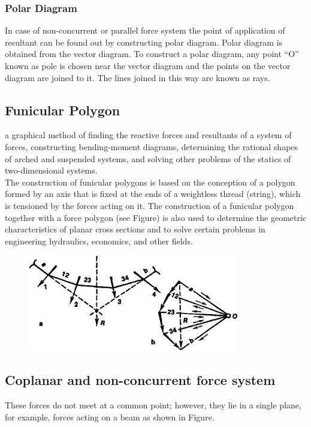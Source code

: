 \documentclass[11pt]{article}
\begin{document}
\subsubsection{Polar Diagram}
In case of non-concurrent or parallel force system the point of
application of resultant can be found out by constructing polar diagram. Polar
diagram is obtained from the vector diagram. To construct a polar diagram, any
point “O” known as pole is chosen near the vector diagram and the points on the
vector diagram are joined to it. The lines joined in this way are known as rays. 
\subsection{Funicular Polygon}

a graphical method of finding the reactive forces and resultants of a system of forces, constructing bending-moment diagrams, determining the rational shapes of arched and suspended systems, and solving other problems of the statics of two-dimensional systems.\\

The construction of funicular polygons is based on the conception of a polygon formed by an axis that is fixed at the ends of a weightless thread (string), which is tensioned by the forces acting on it. The construction of a funicular polygon together with a force polygon (see Figure) is also used to determine the geometric characteristics of planar cross sections and to solve certain problems in engineering hydraulics, economics, and other fields.
\begin{figure}[H]
	\centering
	\includegraphics[scale=0.5]{fp.jpg}
	\label{fig: Polygon Law}

\end{figure}

\subsection{Coplanar and non-concurrent force system}
These forces do not meet at a common point; however, they lie in a single plane, for example, forces acting on a beam as shown in Figure. 
\end{document}
